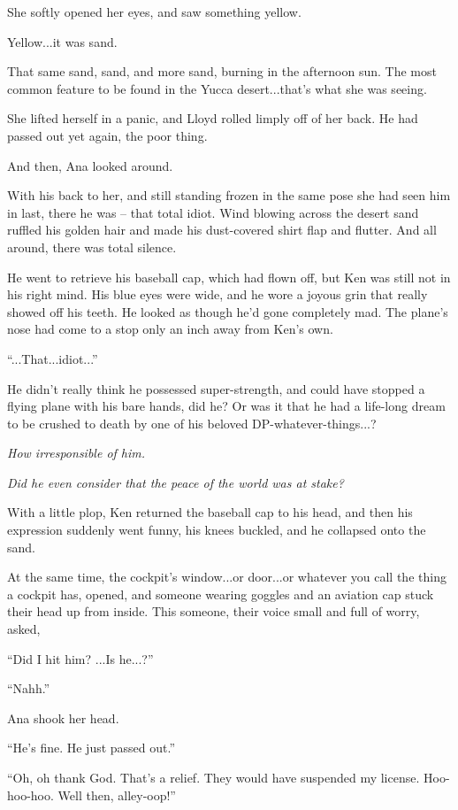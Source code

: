\documentclass[
]{article}
\begin{document}
She softly opened her eyes, and saw something yellow.

Yellow...it was sand.

That same sand, sand, and more sand, burning in the afternoon sun. The
most common feature to be found in the Yucca desert...that's what she
was seeing.

She lifted herself in a panic, and Lloyd rolled limply off of her back.
He had passed out yet again, the poor thing.

And then, Ana looked around.

With his back to her, and still standing frozen in the same pose she had
seen him in last, there he was -- that total idiot. Wind blowing across
the desert sand ruffled his golden hair and made his dust-covered shirt
flap and flutter. And all around, there was total silence.

He went to retrieve his baseball cap, which had flown off, but Ken was
still not in his right mind. His blue eyes were wide, and he wore a
joyous grin that really showed off his teeth. He looked as though he'd
gone completely mad. The plane's nose had come to a stop only an inch
away from Ken's own.

``...That...idiot...''

He didn't really think he possessed super-strength, and could have
stopped a flying plane with his bare hands, did he? Or was it that he
had a life-long dream to be crushed to death by one of his beloved
DP-whatever-things...?

\emph{How irresponsible of him.}

\emph{Did he even consider that the peace of the world was at stake?}

With a little plop, Ken returned the baseball cap to his head, and then
his expression suddenly went funny, his knees buckled, and he collapsed
onto the sand.

At the same time, the cockpit's window...or door...or whatever you call
the thing a cockpit has, opened, and someone wearing goggles and an
aviation cap stuck their head up from inside. This someone, their voice
small and full of worry, asked,

``Did I hit him? ...Is he...?''

``Nahh.''

Ana shook her head.

``He's fine. He just passed out.''

``Oh, oh thank God. That's a relief. They would have suspended my
license. Hoo-hoo-hoo. Well then, alley-oop!''
\end{document}
